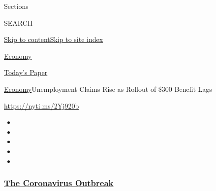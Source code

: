 Sections

SEARCH

\protect\hyperlink{site-content}{Skip to
content}\protect\hyperlink{site-index}{Skip to site index}

\href{https://www.nytimes3xbfgragh.onion/section/business/economy}{Economy}

\href{https://myaccount.nytimes3xbfgragh.onion/auth/login?response_type=cookie\&client_id=vi}{}

\href{https://www.nytimes3xbfgragh.onion/section/todayspaper}{Today's
Paper}

\href{/section/business/economy}{Economy}\textbar{}Unemployment Claims
Rise as Rollout of \$300 Benefit Lags

\url{https://nyti.ms/2Yj920b}

\begin{itemize}
\item
\item
\item
\item
\item
\end{itemize}

\hypertarget{the-coronavirus-outbreak}{%
\subsubsection{\texorpdfstring{\href{https://www.nytimes3xbfgragh.onion/news-event/coronavirus?name=styln-coronavirus-markets\&region=TOP_BANNER\&variant=undefined\&block=storyline_menu_recirc\&action=click\&pgtype=Article\&impression_id=86da1990-e384-11ea-8b08-6ddcf202df60}{The
Coronavirus
Outbreak}}{The Coronavirus Outbreak}}\label{the-coronavirus-outbreak}}

